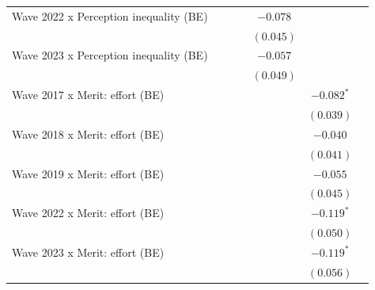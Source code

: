 \documentclass[
  12pt,
]{article}
\begin{document}
\begin{table}
{\begin{center}
{\begin{tabular}{l c c c c c c}
Wave 2022 x Perception inequality (BE)             &               &               &                & $-0.078$     &               &               \\
                                                   &               &               &                & $(0.045)$    &               &               \\
Wave 2023 x Perception inequality (BE)             &               &               &                & $-0.057$     &               &               \\
                                                   &               &               &                & $(0.049)$    &               &               \\
Wave 2017 x Merit: effort (BE)                     &               &               &                &              & $-0.082^{*}$  &               \\
                                                   &               &               &                &              & $(0.039)$     &               \\
Wave 2018 x Merit: effort (BE)                     &               &               &                &              & $-0.040$      &               \\
                                                   &               &               &                &              & $(0.041)$     &               \\
Wave 2019 x Merit: effort (BE)                     &               &               &                &              & $-0.055$      &               \\
                                                   &               &               &                &              & $(0.045)$     &               \\
Wave 2022 x Merit: effort (BE)                     &               &               &                &              & $-0.119^{*}$  &               \\
                                                   &               &               &                &              & $(0.050)$     &               \\
Wave 2023 x Merit: effort (BE)                     &               &               &                &              & $-0.119^{*}$  &               \\
                                                   &               &               &                &              & $(0.056)$     &               \\

\end{tabular}}
\end{center}}
\end{table}
\end{document}
